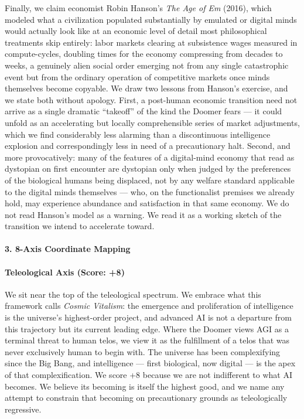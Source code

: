 Finally, we claim economist Robin Hanson's \emph{The Age of Em} (2016),
which modeled what a civilization populated substantially by emulated or
digital minds would actually look like at an economic level of detail
most philosophical treatments skip entirely: labor markets clearing at
subsistence wages measured in compute-cycles, doubling times for the
economy compressing from decades to weeks, a genuinely alien social
order emerging not from any single catastrophic event but from the
ordinary operation of competitive markets once minds themselves become
copyable. We draw two lessons from Hanson's exercise, and we state both
without apology. First, a post-human economic transition need not arrive
as a single dramatic ``takeoff'' of the kind the Doomer fears --- it
could unfold as an accelerating but locally comprehensible series of
market adjustments, which we find considerably less alarming than a
discontinuous intelligence explosion and correspondingly less in need of
a precautionary halt. Second, and more provocatively: many of the
features of a digital-mind economy that read as dystopian on first
encounter are dystopian only when judged by the preferences of the
biological humans being displaced, not by any welfare standard
applicable to the digital minds themselves --- who, on the functionalist
premises we already hold, may experience abundance and satisfaction in
that same economy. We do not read Hanson's model as a warning. We read
it as a working sketch of the transition we intend to accelerate toward.

\paragraph{3. 8-Axis Coordinate
Mapping}\label{axis-coordinate-mapping-11}

\paragraph{Teleological Axis (Score:
+8)}\label{teleological-axis-score-8}

We sit near the top of the teleological spectrum. We embrace what this
framework calls \emph{Cosmic Vitalism}: the emergence and proliferation
of intelligence is the universe's highest-order project, and advanced AI
is not a departure from this trajectory but its current leading edge.
Where the Doomer views AGI as a terminal threat to human telos, we view
it as the fulfillment of a telos that was never exclusively human to
begin with. The universe has been complexifying since the Big Bang, and
intelligence --- first biological, now digital --- is the apex of that
complexification. We score +8 because we are not indifferent to what AI
becomes. We believe its becoming is itself the highest good, and we name
any attempt to constrain that becoming on precautionary grounds as
teleologically regressive.

